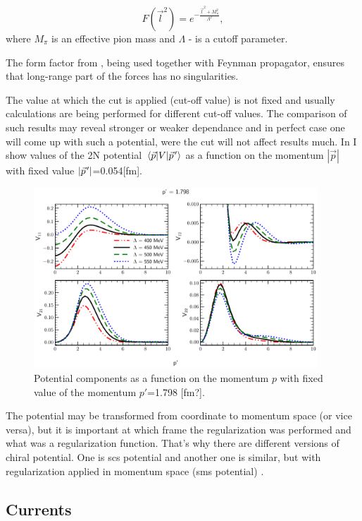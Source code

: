 \begin{equation}
    F(\vec{l}^2) = e^{-\frac{\vec{l}^2 + M_\pi^2}{\Lambda^2}},
    \label{regulator}
\end{equation}
where $M_\pi$ is an effective pion mass and $\Lambda$ - is a cutoff parameter.

The form factor from , being used together with Feynman propagator,
ensures that long-range part of the forces has no singularities. 

The value at which
the cut is applied (cut-off value) is not fixed and usually calculations
are being performed for different cut-off values. The comparison
of such results may reveal stronger or weaker dependance and in perfect
case one will come up with such a potential, were the cut will
not affect results much. In  
I show values of the 2N potential $\matrixel{\vec{p}}{V}{\pvec{p}}$
as a function on the momentum $|\vec{p}|$ with fixed value $|\pvec{p}|$=0.054[fm].



\begin{figure}[htb]
    \begin{center}
    \includegraphics[width=0.95\textwidth]{PlotData/Deuteron/WAVEFUNC/potential_pp1.798.pdf}
    \end{center}
    \caption{Potential components as a function on the momentum $p$ with fixed
    value of the momentum $p'$=1.798 [fm?].
    }
    \label{potential_cutoff}
\end{figure}



The potential may be transformed from coordinate to momentum space (or vice versa),
but it is important at which frame the regularization was performed
and what was a regularization function. That's why there are different 
versions of chiral potential. One is \gls{scs} potential \cite{Epelbaum2014SCS}
and another one is similar, but with regularization applied in momentum space (\gls{sms} potential) \cite{reinkrebs2018}.


\subsection*{Currents}
 


